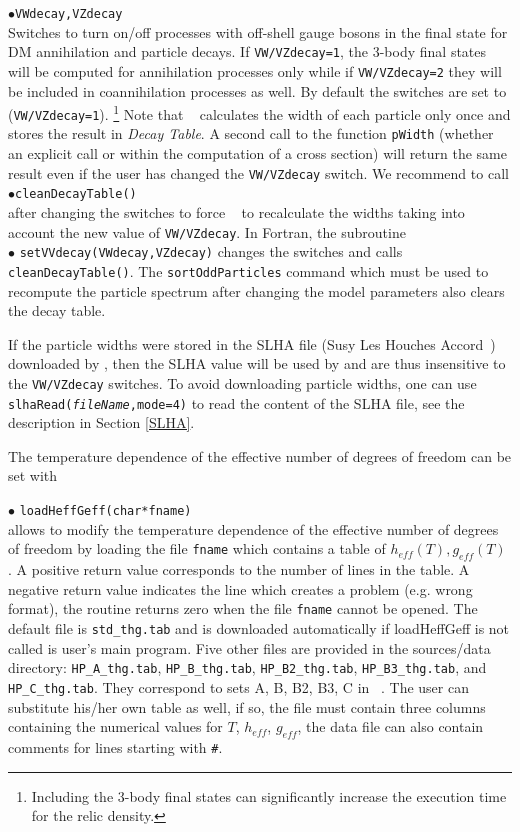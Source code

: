 \documentclass[12pt,a4paper]{article}
\begin{document}
\noindent
$\bullet$\verb|VWdecay,VZdecay|\\
Switches to turn on/off  processes with off-shell gauge bosons in the final state for DM annihilation and particle decays.
If \verb|VW/VZdecay=1|, the  3-body final states will be computed for annihilation processes only while 
if \verb|VW/VZdecay=2| they will be included in coannihilation processes as well.
By  default  the switches are set to (\verb|VW/VZdecay=1|). \footnote{Including the 3-body final states can significantly increase the execution time for the relic density.}
Note that \micro~ calculates the width of each particle only once and stores the
result in {\it Decay Table}.  A second call to the function \verb|pWidth| (whether an explicit call or within the computation of a cross section)   will return the same result  even if the user has changed the {\tt VW/VZdecay} switch.  
We recommend to call\\
$\bullet$\verb|cleanDecayTable()| \\
after changing the switches to force \micro~ to recalculate the widths taking into account  the new value of {\tt VW/VZdecay}.
In Fortran, the subroutine\\
$\bullet$ \verb|setVVdecay(VWdecay,VZdecay)| changes the
switches and calls {\tt cleanDecayTable()}.
The   {\tt sortOddParticles} command which must be used 
to recompute the particle spectrum after changing the model parameters also clears  the decay table.

If the particle widths  were stored in the SLHA file (Susy Les Houches Accord~\cite{Skands:2003cj})  downloaded by \micro, then the SLHA value will be used by and are thus insensitive to the {\tt VW/VZdecay} switches. To avoid downloading particle widths, one can use  
{\tt slhaRead({\it fileName},mode=4)} to read the content of the SLHA file, see the description in Section
\ref{SLHA}. 

The temperature dependence of the effective number of degrees of freedom can be set with

\noindent$\bullet$ \verb|loadHeffGeff(char*fname)|\\
allows to modify the temperature dependence of the effective number of degrees of freedom
by loading the file \verb|fname| which contains a table of $h_{eff}(T), g_{eff}(T)$ . 
A positive  return value corresponds to the number of lines in the table. A negative return value indicates the line which creates a problem (e.g. wrong format), the routine returns zero when the file \verb|fname| cannot be opened.  The default file is \verb|std_thg.tab| and is downloaded automatically if 
loadHeffGeff is not called is user's main program. Five other files are provided in the sources/data directory:  \verb|HP_A_thg.tab|,  \verb|HP_B_thg.tab|, \verb|HP_B2_thg.tab|,  \verb|HP_B3_thg.tab|,    and \verb|HP_C_thg.tab|. They   correspond to sets A, B, B2, B3, C in ~\cite{Hindmarsh:2005ix}.
The user can substitute his/her own table as well, if so, the file must contain three columns containing the numerical values for $T$, $h_{eff}$, $g_{eff}$, the data file can also contain comments for lines starting with \verb|#|.
\end{document}
